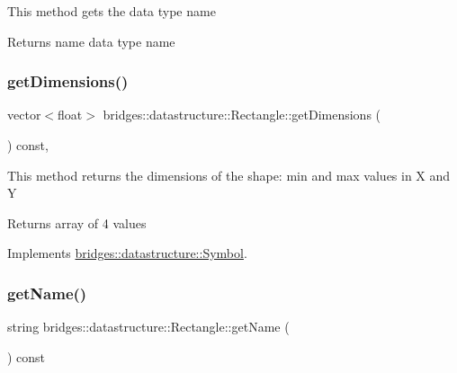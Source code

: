 This method gets the data type name

\begin{DoxyReturn}{Returns}
name data type name 
\end{DoxyReturn}
\mbox{\label{classbridges_1_1datastructure_1_1_rectangle_a60e75bd0d064c63a726134cd5ca0b827}} 
\subsubsection{\texorpdfstring{get\+Dimensions()}{getDimensions()}}
{\footnotesize\ttfamily vector$<$float$>$ bridges\+::datastructure\+::\+Rectangle\+::get\+Dimensions (\begin{DoxyParamCaption}{ }\end{DoxyParamCaption}) const\hspace{0.3cm}{\ttfamily [inline]}, {\ttfamily [virtual]}}

This method returns the dimensions of the shape\+: min and max values in X and Y

\begin{DoxyReturn}{Returns}
array of 4 values 
\end{DoxyReturn}


Implements \hyperlink{classbridges_1_1datastructure_1_1_symbol_a5c1cb50770c4f4a2ff9c8642afc0d665}{bridges\+::datastructure\+::\+Symbol}.

\mbox{\label{classbridges_1_1datastructure_1_1_rectangle_aee4fa283fa95e8c3b9f8efd5b19427b8}} 
\subsubsection{\texorpdfstring{get\+Name()}{getName()}}
{\footnotesize\ttfamily string bridges\+::datastructure\+::\+Rectangle\+::get\+Name (\begin{DoxyParamCaption}{ }\end{DoxyParamCaption}) const\hspace{0.3cm}{\ttfamily [inline]}}

